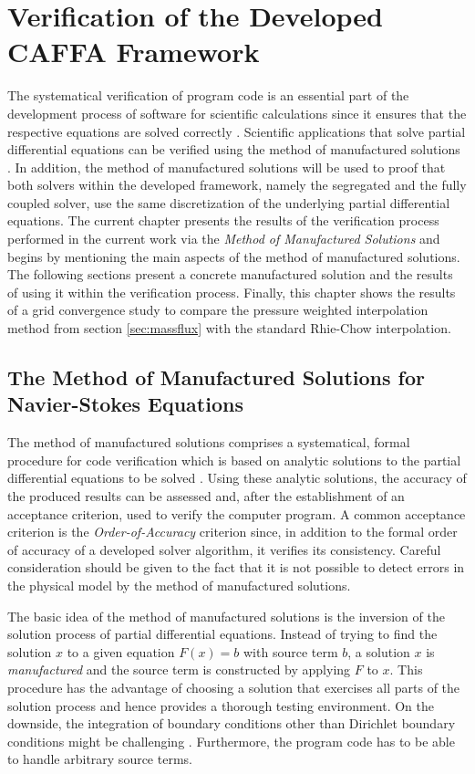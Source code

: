 \chapter{Verification of the Developed CAFFA Framework}
\label{sec:verification}

The systematical verification of program code is an essential part of the development process of software for scientific calculations since it ensures that the respective equations are solved correctly \cite{oberkampf02}. Scientific applications that solve partial differential equations can be verified using the method of manufactured solutions \cite{salari00}. In addition, the method of manufactured solutions will be used to proof that both solvers within the developed framework, namely the segregated and the fully coupled solver, use the same discretization of the underlying partial differential equations. The current chapter presents the results of the verification process performed in the current work via the \emph{Method of Manufactured Solutions} and begins by mentioning the main aspects of the method of manufactured solutions. The following sections present a concrete manufactured solution and the results of using it within the verification process. Finally, this chapter shows the results of a grid convergence study to compare the pressure weighted interpolation method from section \ref{sec:massflux} with the standard Rhie-Chow interpolation.

\section{The Method of Manufactured Solutions for Navier-Stokes Equations}

The method of manufactured solutions comprises a systematical, formal procedure for code verification which is based on analytic solutions to the partial differential equations to be solved \cite{salari00}. Using these analytic solutions, the accuracy of the produced results can be assessed and, after the establishment of an acceptance criterion, used to verify the computer program. A common acceptance criterion is the \emph{Order-of-Accuracy} criterion since, in addition to the formal order of accuracy of a developed solver algorithm, it verifies its consistency. Careful consideration should be given to the fact that it is not possible to detect errors in the physical model by the method of manufactured solutions.

The basic idea of the method of manufactured solutions is the inversion of the solution process of partial differential equations. Instead of trying to find the solution \(x\) to a given equation \(F(x) = b\) with source term \(b\), a solution \(x\) is \emph{manufactured} and the source term is constructed by applying \(F\) to \(x\). This procedure has the advantage of choosing a solution that exercises all parts of the solution process and hence provides a thorough testing environment. On the downside, the integration of boundary conditions other than Dirichlet boundary conditions might be challenging \cite{salari00}. Furthermore, the program code has to be able to handle arbitrary source terms. 

